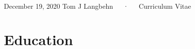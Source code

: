 \documentclass[11pt, a4paper]{awesome-cv}
\begin{document}
\makecvheader

\makecvfooter
  {December 19, 2020}
    {Tom J Langbehn~~~·~~~Curriculum Vitae}
  {\thepage}





\hypertarget{education}{%
\section{Education}\label{education}}
\end{document}
